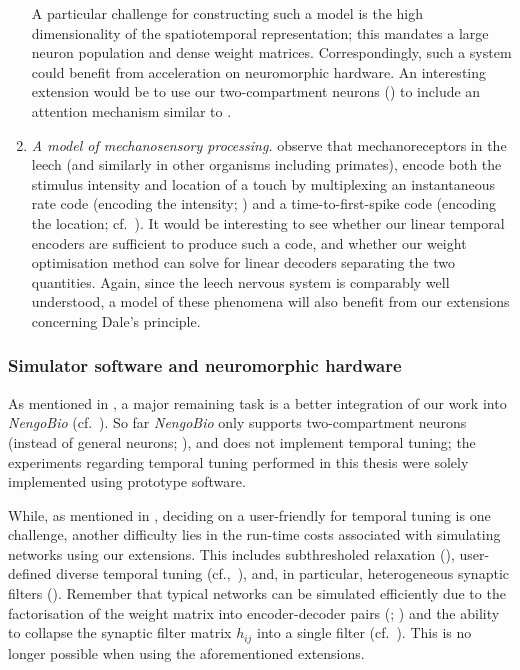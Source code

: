 \begin{enumerate}[1.]
	A particular challenge for constructing such a model is the high dimensionality of the spatiotemporal representation; this mandates a large neuron population and dense weight matrices.
	Correspondingly, such a system could benefit from acceleration on neuromorphic hardware.
	An interesting extension would be to use our two-compartment \LIF neurons () to include an attention mechanism similar to \citet{bobier2014unifying}.

	\item \emph{A model of mechanosensory processing.}
	 observe that mechanoreceptors in the leech (and similarly in other organisms including primates), encode both the stimulus intensity and location of a touch by multiplexing an instantaneous rate code (encoding the intensity; ) and a time-to-first-spike code (encoding the location; cf.~\cite{thorpe2001spikebased}).
	It would be interesting to see whether our linear temporal encoders are sufficient to produce such a code, and whether our weight optimisation method can solve for linear decoders separating the two quantities.
	Again, since the leech nervous system is comparably well understood, a model of these phenomena will also benefit from our extensions concerning Dale's principle.
\end{enumerate}

\subsubsection{Simulator software and neuromorphic hardware}

As mentioned in , a major remaining task is a better integration of our work into \emph{NengoBio} (cf.~).
So far \emph{NengoBio} only supports two-compartment \LIF neurons (instead of general \nlif neurons; ), and does not implement temporal tuning; the experiments regarding temporal tuning performed in this thesis were solely implemented using prototype software.

While, as mentioned in , deciding on a user-friendly \API for temporal tuning is one challenge, another difficulty lies in the run-time costs associated with simulating networks using our extensions.
This includes subthresholed relaxation (), user-defined diverse temporal tuning (cf.,~), and, in particular, heterogeneous synaptic filters ().
Remember that typical \NEF networks can be simulated efficiently due to the factorisation of the weight matrix into encoder-decoder pairs (; \cite{bekolay2014nengo}) and the ability to collapse the synaptic filter matrix $h_{ij}$ into a single filter (cf.~).
This is no longer possible when using the aforementioned extensions.

